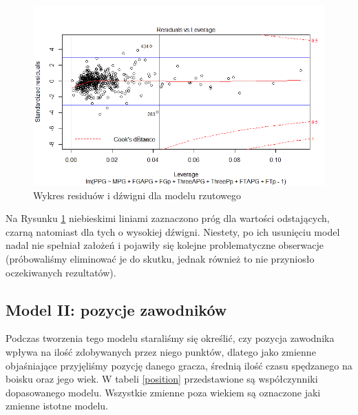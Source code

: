 \documentclass[11pt,a4paper]{article}
\begin{document}
\begin{figure}[t]
	\includegraphics[width=\textwidth]{offense_4}
	\caption{Wykres residuów i dźwigni dla modelu rzutowego}
	\label{leverage_offense}
	\centering
\end{figure}
Na Rysunku \ref{leverage_offense} niebieskimi liniami zaznaczono próg dla wartości odstających, czarną natomiast dla tych o wysokiej dźwigni. Niestety, po ich usunięciu model nadal nie spełniał założeń i pojawiły się kolejne problematyczne obserwacje (próbowaliśmy eliminować je do skutku, jednak również to nie przyniosło oczekiwanych rezultatów).

\subsection{Model II: pozycje zawodników}
Podczas tworzenia tego modelu staraliśmy się określić, czy pozycja zawodnika wpływa na ilość zdobywanych przez niego punktów, dlatego jako zmienne objaśniające przyjęliśmy pozycję danego gracza, średnią ilość czasu spędzanego na boisku oraz jego wiek. W tabeli \ref{position} przedstawione są współczynniki dopasowanego modelu. Wszystkie zmienne poza wiekiem są oznaczone jaki zmienne istotne modelu. 
\end{document}
